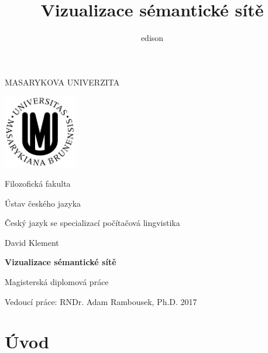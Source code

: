 \documentclass[a4paper, 11pt, oneside]{book}
\author{edison}
\title{Vizualizace sémantické sítě}
\begin{document}
	
	\begin{titlepage}
		\begin{center}
			{\Large\uppercase{Masarykova univerzita}}

			\vspace{1em}

			\includegraphics[width=0.24\textwidth]{logo-muni.png}
			
			\vspace{2em}

			{\Large Filozofická fakulta}

			\vspace{1em}

			{\large Ústav českého jazyka}

			\vspace{1em}

			{\large Český jazyk se specializací počítačová lingvistika}

			\vspace{7em}

			{\Large David Klement}
			
			\vspace{5em}
			
			{\huge\bf Vizualizace sémantické sítě}

			\vspace{1.5em}

			{\Large Magisterská diplomová práce}

			\vfill
		\end{center}
		\begin{flushleft}
			Vedoucí práce: RNDr. Adam Rambousek, Ph.D. \hfill 2017
		\end{flushleft}
	\end{titlepage}

	\newpage

	{
		\tableofcontents
	}

	\newpage

	\chapter*{Úvod}\label{uvod}
\end{document}
